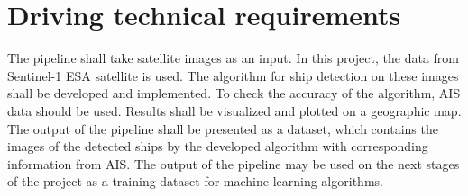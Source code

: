 \section{Driving technical requirements}

The pipeline shall take satellite images as an input. In this project, the data from Sentinel-1 \gls{ESA} satellite is used. The algorithm for ship detection on these images shall be developed and implemented. To check the accuracy of the algorithm, AIS data should be used. Results shall be visualized and plotted on a geographic map. The output of the pipeline shall be presented as a dataset, which contains the images of the detected ships by the developed algorithm with corresponding information from \gls{AIS}. The output of the pipeline may be used on the next stages of the project as a training dataset for machine learning algorithms.
